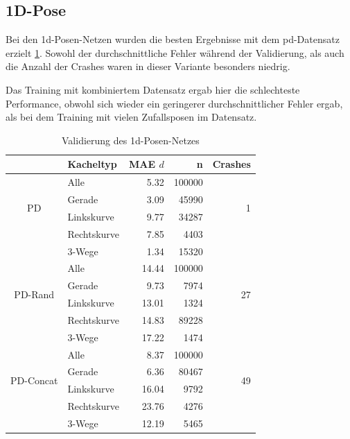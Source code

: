 \subsection{1D-Pose}

Bei den \acs{1d}-Posen-Netzen wurden die besten Ergebnisse mit dem \glqq\acs{pd}\grqq-Datensatz erzielt \ref{1d-validation}. Sowohl der durchschnittliche Fehler während der Validierung, als auch die Anzahl der Crashes waren in dieser Variante besonders niedrig.

Das Training mit kombiniertem Datensatz ergab hier die schlechteste Performance, obwohl sich wieder ein geringerer durchschnittlicher Fehler ergab, als bei dem Training mit vielen Zufallsposen im Datensatz.

\begin{table}[H]
	\centering
	\begin{tabular}[t]{|c|l|r|r|r|}
		\hline
		& \textbf{Kacheltyp} & \textbf{MAE $d$} & \textbf{n} & Crashes \\
		\hline
		\multirow{4}{*}{PD} 
		& Alle
		& 5.32
		& 100000
		& \multirow{4}{*}{1}\\
		\cline{2-4}
		& Gerade
		&  3.09
		& 45990
		&\\
		\cline{2-4}
		& Linkskurve
		& 9.77
		& 34287
		&\\
		\cline{2-4}
		& Rechtskurve
		& 7.85
		& 4403
		&\\
		\cline{2-4}
		& 3-Wege
		&  1.34
		& 15320
		&\\
		\hline
		\multirow{4}{*}{PD-Rand} 
		& Alle
		& 14.44
		& 100000
		& \multirow{4}{*}{27}\\
		\cline{2-4}
		& Gerade
		&  9.73
		& 7974
		& \\
		\cline{2-4}
		& Linkskurve
		& 13.01
		& 1324
		&\\
		\cline{2-4}
		& Rechtskurve
		& 14.83
		& 89228
		&\\
		\cline{2-4}
		& 3-Wege
		& 17.22
		& 1474
		&\\
		\hline
		\multirow{4}{*}{PD-Concat} 
		& Alle
		& 8.37
		& 100000
		& \multirow{4}{*}{49}\\
		\cline{2-4}
		& Gerade
		& 6.36
		& 80467
		&\\
		\cline{2-4}
		& Linkskurve
		& 16.04
		& 9792
		&\\
		\cline{2-4}
		& Rechtskurve
		& 23.76
		& 4276
		&\\
		\cline{2-4}
		& 3-Wege
		& 12.19
		& 5465
		&\\
		\hline
	\end{tabular}
	\caption{Validierung des \acs{1d}-Posen-Netzes}
	\label{1d-validation}
\end{table}

